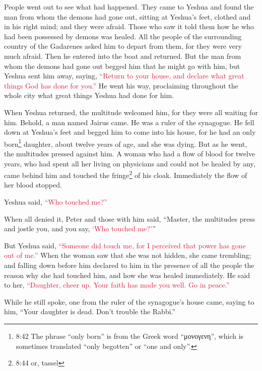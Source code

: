 \myverse{}People went out to see what had happened. They came to Yeshua
and found the man from whom the demons had gone out, sitting at Yeshua’s feet, clothed and in his right
mind; and they were afraid.
\myverse{}Those who saw it told them how he who had been possessed by demons was healed.
\myverse{}All the people of the surrounding country of the Gadarenes asked him to depart
from them, for they were very much afraid. Then he entered into the boat and returned.
\myverse{}But the man from whom the demons had gone out begged him that he might go
with him, but Yeshua sent him away, saying,
\myverse{}\textcolor{crimson}{“Return to your house, and declare what great things God has done for
	you.”} He went his way, proclaiming throughout the whole city what great things Yeshua had done for
him.

\myverse{}When Yeshua returned, the multitude welcomed him, for they were
all waiting for him.
\myverse{}Behold, a man named Jairus came. He was a ruler of the synagogue. He fell
down at Yeshua’s feet and begged him to come into his house,
\myverse{}for he had an only born\footnote{8:42 The phrase “only born” is from the Greek word “μονογενη”, which is sometimes translated “only
	begotten” or “one and only”.} daughter, about twelve years of age, and she was dying. But as he
went, the multitudes pressed against him.
\myverse{}A woman who had a flow of blood for twelve years, who had spent all her living
on physicians and could not be healed by any,
\myverse{}came behind him and touched the fringe\footnote{8:44 or, tassel} of his cloak. Immediately the flow of her blood stopped.

\myverse{}Yeshua said,
\textcolor{crimson}{“Who touched me?”}

When all denied it, Peter and those with him said, “Master, the multitudes press and jostle
you, and you say,
\textcolor{crimson}{‘Who touched me?’}”

\myverse{}But Yeshua said,
\textcolor{crimson}{“Someone did touch me, for I perceived that power has gone out of me.”}
\myverse{}When the woman saw that she was not hidden, she came trembling; and falling
down before him declared to him in the presence of all the people the reason why she had touched him,
and how she was healed immediately.
\myverse{}He said to her,
\textcolor{crimson}{“Daughter, cheer up. Your faith has made you well. Go in peace.”}

\myverse{}While he still spoke, one from the ruler of the synagogue’s house
came, saying to him, “Your daughter is dead. Don’t trouble the Rabbi.”

